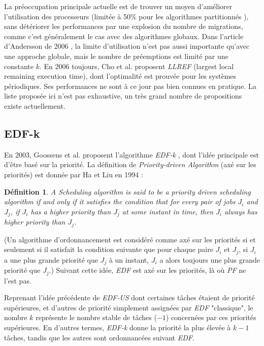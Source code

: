 \documentclass[11pt,a4paper,oneside]{report}
\newtheorem{mydef}{Définition}
\begin{document}
	La préoccupation principale actuelle est de trouver un moyen d'améliorer l'utilisation des processeurs (limitée à 
	50\% pour les algorithmes partitionnés \cite{oh_utilization_1998}), sans détériorer les performances par 
	une explosion du nombre de migrations, comme c'est généralement le cas avec des algorithmes globaux. 
	Dans l'article d'Andersson de 2006 \cite{andersson_multiprocessor_2006}, la limite d'utilisation 
	n'est pas aussi importante qu'avec une approche globale, mais le nombre de préemptions est limité par 
	une constante $k$. En 2006 toujours, Cho et al. \cite{cho_optimal_2006} proposent \textit{LLREF} 
	(largest local remaining execution time), dont l'optimalité est prouvée pour les 
	systèmes périodiques. Ses performances ne sont à ce jour pas bien connues en pratique. 
	La liste proposée ici n'est pas exhaustive, un très grand nombre de propositions existe actuellement. 
	
	\subsection{EDF-k}
	En 2003, Goossens et al. proposent l'algorithme \textit{EDF-k} \cite{goossens_priority-driven_2003}, 
	dont l'idée principale est d'être basé sur la priorité. 
	La définition de \textit{Priority-driven Algorithm} (axé sur les priorités) 
	est donnée par Ha et Liu en 1994 :
	\begin{mydef}
		A Scheduling algorithm is said to be a priority driven scheduling algorithm if and 
		only if it satisfies the condition 
		that for every pair of jobs $J_i$ and $J_j$, if $J_i$ has a higher priority than $J_j$ at 
		some instant in time, then $J_i$ always has higher priority than $J_j$.
	\end{mydef}
	(Un algorithme d'ordonnancement est considéré comme axé sur les priorités si et seulement si il 
	satisfait la condition suivante que pour chaque paire $J_i$ et $J_j$, si $J_i$ a une plus 
	grande priorité que $J_j$ à un instant, $J_i$ a alors toujours une plus grande priorité 
	que $J_j$.)\medskip
	Suivant cette idée, \textit{EDF} est axé sur les priorités, là où \textit{PF} ne l'est pas.\medskip
	
	Reprenant l'idée précédente de \textit{EDF-US} dont certaines tâches étaient de priorité 
	supérieures, et d'autres de priorité simplement assignées par \textit{EDF} "classique", 
	le nombre $k$ représente le nombre stable de tâches ($-1$) concernées par ces priorités 
	supérieures. En d'autres termes, \textit{EDF-k} donne la priorité la plus élevée à 
	$k - 1$ tâches, tandis que les autres sont ordonnancées suivant \textit{EDF}.\medskip
	
\end{document}

